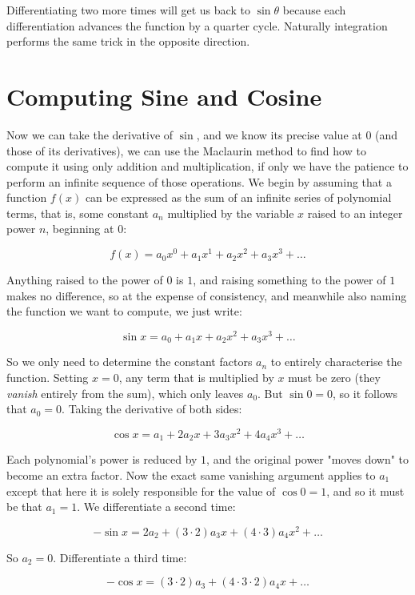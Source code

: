 Differentiating two more times will get us back to $\sin \theta$ because each differentiation advances the function by a quarter cycle. Naturally integration performs the same trick in the opposite direction.

\section{Computing Sine and Cosine} \label{sec:unit-circle-maclaurin}

Now we can take the derivative of $\sin$, and we know its precise value at $0$ (and those of its derivatives), we can use the Maclaurin method to find how to compute it using only addition and multiplication, if only we have the patience to perform an infinite sequence of those operations. We begin by assuming that a function $f(x)$ can be expressed as the sum of an infinite series of polynomial terms, that is, some constant $a_n$ multiplied by the variable $x$ raised to an integer power $n$, beginning at $0$:

$$
f(x) = a_0x^0 + a_1x^1 + a_2x^2 + a_3x^3 + \ldots
$$

Anything raised to the power of $0$ is $1$, and raising something to the power of $1$ makes no difference, so at the expense of consistency, and meanwhile also naming the function we want to compute, we just write:

$$
\sin x = a_0 + a_1x + a_2x^2 + a_3x^3 + \ldots
$$

So we only need to determine the constant factors $a_n$ to entirely characterise the function. Setting $x = 0$, any term that is multiplied by $x$ must be zero (they \textit{vanish} entirely from the sum), which only leaves $a_0$. But $\sin 0 = 0$, so it follows that $a_0 = 0$. Taking the derivative of both sides:

$$
\cos x = a_1 + 2a_2x + 3a_3x^2 + 4a_4x^3 + \ldots
$$

Each polynomial's power is reduced by $1$, and the original power "moves down" to become an extra factor. Now the exact same vanishing argument applies to $a_1$ except that here it is solely responsible for the value of $\cos 0 = 1$, and so it must be that $a_1 = 1$. We differentiate a second time:

$$
-\sin x = 2a_2 + (3\cdot2)a_3x + (4\cdot3)a_4x^2 + \ldots
$$

So $a_2 = 0$. Differentiate a third time:

$$
-\cos x = (3\cdot2)a_3 + (4\cdot3\cdot2)a_4x + \ldots
$$

